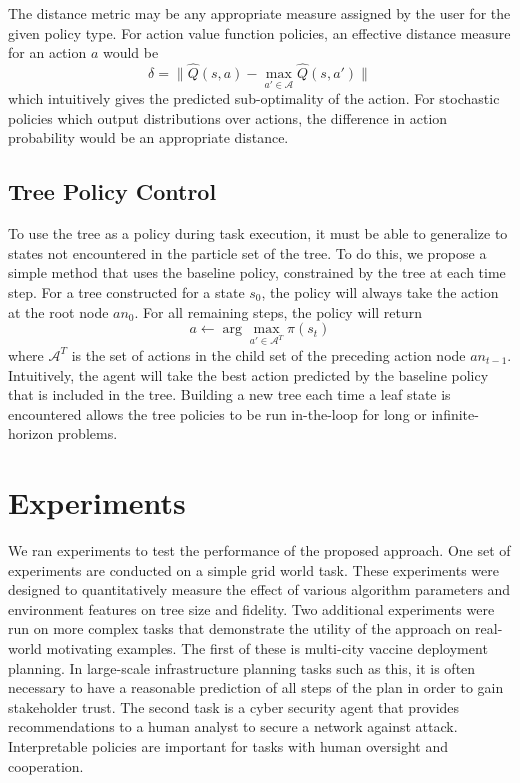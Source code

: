 \documentclass[letterpaper]{article} %
\begin{document}
The distance metric may be any appropriate measure assigned by the user for the given policy type. 
For action value function policies, an effective distance measure for an action $a$ would be 
\begin{equation}\label{eq: delta dqn}
    \delta = \| \hat{Q}(s, a) - \max_{a' \in \mathcal{A}} \hat{Q}(s, a') \| 
\end{equation}
which intuitively gives the predicted sub-optimality of the action.
For stochastic policies which output distributions over actions, the difference in action probability would be an appropriate distance.

\subsection{Tree Policy Control}\label{sec: tree execution}
To use the tree as a policy during task execution, it must be able to generalize to states not encountered in the particle set of the tree. 
To do this, we propose a simple method that uses the baseline policy, constrained by the tree at each time step. 
For a tree constructed for a state $s_0$, the policy will always take the action at the root node $an_0$.
For all remaining steps, the policy will return
\begin{equation}
    a \gets \arg\max_{a' \in \mathcal{A}^T} \pi(s_t)
\end{equation}
where $\mathcal{A}^T$ is the set of actions in the child set of the preceding action node $an_{t-1}$.
Intuitively, the agent will take the best action predicted by the baseline policy that is included in the tree. 
Building a new tree each time a leaf state is encountered allows the tree policies to be run in-the-loop for long or infinite-horizon problems.

\section{Experiments}
We ran experiments to test the performance of the proposed approach. 
One set of experiments are conducted on a simple grid world task. 
These experiments were designed to quantitatively measure the effect of various algorithm parameters and environment features on tree size and fidelity. 
Two additional experiments were run on more complex tasks that demonstrate the utility of the approach on real-world motivating examples. 
The first of these is multi-city vaccine deployment planning. 
In large-scale infrastructure planning tasks such as this, it is often necessary to have a reasonable prediction of all steps of the plan in order to gain stakeholder trust.
The second task is a cyber security agent that provides recommendations to a human analyst to secure a network against attack. 
Interpretable policies are important for tasks with human oversight and cooperation.  
\end{document}
